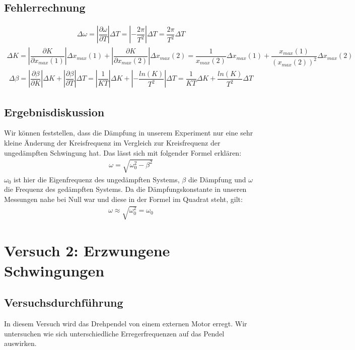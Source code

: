 \documentclass{scrartcl}
\begin{document}
\subsection{Fehlerrechnung}
\begin{align*}
\Delta \omega = \left| \dfrac{\partial \omega}{\partial T} \right| \Delta T = \left| - \dfrac{2 \pi}{T^{2}} \right| \Delta T = \dfrac{2 \pi}{T^{2}}  \Delta T
\end{align*}
\begin{align*}
\Delta K = \left| \dfrac{\partial K}{\partial x_{max}(1)} \right| \Delta x_{max}(1) + \left| \dfrac{\partial K}{\partial x_{max}(2)} \right| \Delta x_{max}(2) = \dfrac{1}{x_{max}(2)} \Delta x_{max}(1) + \dfrac{x_{max}(1)}{(x_{max}(2))^2} \Delta x_{max}(2)
\end{align*}
\begin{align*}
\Delta \beta = \left| \dfrac{\partial \beta}{\partial K} \right| \Delta K + \left| \dfrac{\partial \beta}{\partial T} \right| \Delta T = \left| \dfrac{1}{KT} \right| \Delta K + \left| - \dfrac{ln(K)}{T^2} \right| \Delta T = \dfrac{1}{KT} \Delta K + \dfrac{ln(K)}{T^2} \Delta T
\end{align*}
\subsection{Ergebnisdiskussion}
Wir können feststellen, dass die Dämpfung in unserem Experiment nur eine sehr kleine Änderung der Kreisfrequenz im Vergleich zur Kreisfrequenz der ungedämpften Schwingung hat. Das lässt sich mit folgender Formel erklären:
\begin{align*}
\omega = \sqrt{\omega_{0}^2 - \beta^2}
\end{align*}
$\omega_{0}$ ist hier die Eigenfrequenz des ungedämpften Systems, $\beta$ die Dämpfung und $\omega$ die Frequenz des gedämpften Systems. Da die Dämpfungskonstante in unseren Messungen nahe bei Null war und diese in der Formel im Quadrat steht, gilt:
\begin{align*}
\omega \approx \sqrt{\omega_{0}^2} = \omega_{0}
\end{align*}

\section{Versuch 2: Erzwungene Schwingungen}
\subsection{Versuchsdurchführung}
In diesem Versuch wird das Drehpendel von einem externen Motor erregt. Wir untersuchen
wie sich unterschiedliche Erregerfrequenzen auf das Pendel auswirken.
\end{document}

